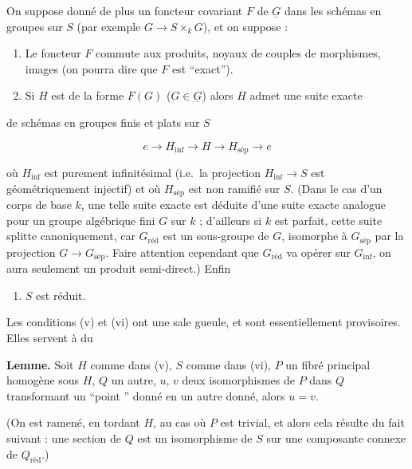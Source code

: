\documentclass[11pt,a4paper]{article}
\begin{document}
On suppose donné de plus un foncteur covariant \struck{\ill{}} $F$ de
$\underline{G}$ dans les  schémas en groupes sur $S$ (par
exemple $G \to S \times_{k} G$), et on suppose :

\begin{enumerate}
\item[(iv)] Le foncteur $F$ commute aux produits,  noyaux de couples
de morphismes, images (on pourra dire que $F$ est ``exact'').
\item[(v)] Si $H$ est \struck{\ill{}} de la forme $F(G)$ ($G \in
\underline{G}$) alors $H$  admet une suite exacte
\end{enumerate}


de schémas en groupes finis et plats sur $S$

\[ e \to H_{\mathrm{inf}} \to H \to H_{\mathrm{sép}} \to e \]

où $H_{\mathrm{inf}}$ est purement infinitésimal (i.e.\ la projection
$H_{\mathrm{inf}} \to S$ est géométriquement injectif) et où
$H_{\mathrm{sép}}$ est non ramifié sur $S$. (Dans le cas d'un corps de base
$k$, une telle suite exacte est déduite d'une suite exacte analogue pour un
groupe algébrique fini $G$ sur $k$ ; d'ailleurs si $k$ est parfait, cette suite
splitte canoniquement, car $G_{\mathrm{réd}}$ est  un sous-groupe de
$G$, isomorphe à $G_{\mathrm{sép}}$ par la projection $G \to
G_{\mathrm{sép}}$. Faire attention cependant que $G_{\mathrm{réd}}$ va opérer
sur $G_{\mathrm{inf}}$, on aura seulement un produit semi-direct.) Enfin

\begin{enumerate}
\item[(vi)] $S$ est réduit.
\end{enumerate}

Les conditions (v) et (vi) ont une sale gueule, et sont essentiellement
provisoires. Elles servent à   du

\textbf{Lemme.} Soit $H$ comme dans (v), $S$ comme dans (vi), $P$ un fibré
principal homogène sous $H$, $Q$ un autre, $u$, $v$ deux isomorphismes de $P$
dans $Q$ transformant un ``point \struck{\ill{}} '' donné en un
autre donné, alors $u = v$.

(On est ramené, en tordant $H$, au cas où $P$ est trivial, et alors cela
résulte du fait suivant : une section de $Q$ est un isomorphisme de $S$ sur une
composante connexe de $Q_{\mathrm{réd}}$.)
\end{document}
